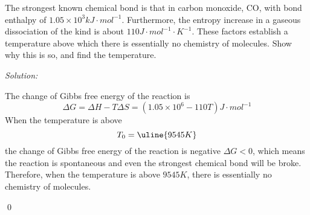 \documentclass[12pt]{article}
\newenvironment{problem}[2][Problem]{\begin{trivlist}
\item[\hskip \labelsep {\bfseries #1}\hskip \labelsep {\bfseries #2.}]}{\end{trivlist}}
\newenvironment{sol}
    {\emph{Solution:}
    }
    {
    \qed
    }
\begin{document}
\begin{problem}{13.58}
The strongest known chemical bond is that in carbon monoxide, CO, with bond enthalpy of $1.05\times10^3kJ\cdot mol^{-1}$. Furthermore, the entropy increase in a gaseous dissociation of the kind  is about $110J\cdot mol^{-1}\cdot K^{-1}$. These factors establish a temperature above which there is essentially no chemistry of molecules. Show why this is so, and find the temperature.
\end{problem}
\begin{sol}
The change of Gibbs free energy of the reaction  is
\[
\Delta G=\Delta H-T\Delta S=(1.05\times10^6-110T)J\cdot mol^{-1}
\]
When the temperature is above
\[
T_0=\uline{9545K}
\]
the change of Gibbs free energy of the reaction is negative $\Delta G<0$, which means the reaction is spontaneous and even the strongest chemical bond will be broke. Therefore, when the temperature is above $9545K$, there is essentially no chemistry of molecules.
\end{sol}
\end{document}
